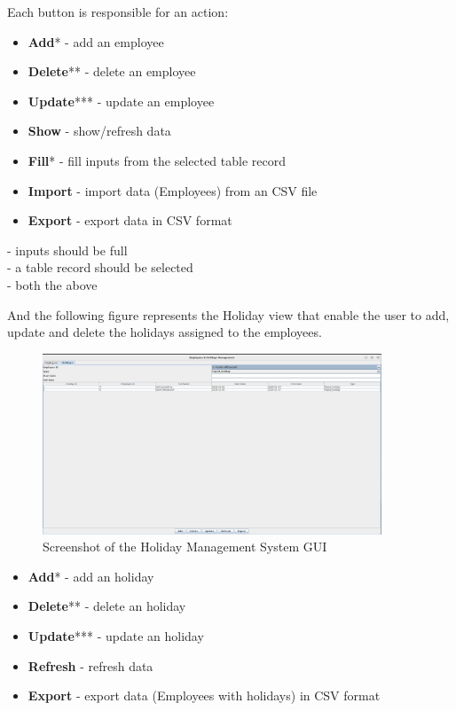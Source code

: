 \documentclass[12pt]{article}
\begin{document}
Each button is responsible for an action:

\begin{itemize}
    \item \textbf{Add}* - add an employee
    \item \textbf{Delete}** - delete an employee
    \item \textbf{Update}*** - update an employee
    \item \textbf{Show} - show/refresh data
    \item \textbf{Fill}* - fill inputs from the selected table record
    \item \textbf{Import} - import data (Employees) from an CSV file
    \item  \textbf{Export} - export data in CSV format 
\end{itemize}

\noindent \text{*} - inputs should be full\\
\text{**} - a table record should be selected\\
\text{***} - both the above

\pagebreak

And the following figure represents the Holiday view that enable
the user to add, update and delete the holidays assigned to the
employees.

\begin{figure}[H]
  \centering
  \includegraphics[width=0.9\textwidth]{holiday_preview.png}
  \caption{Screenshot of the Holiday Management System GUI}
\end{figure}

\begin{itemize}
    \item \textbf{Add}* - add an holiday
    \item \textbf{Delete}** - delete an holiday
	\item \textbf{Update}*** - update an holiday
    \item \textbf{Refresh} - refresh data
    \item  \textbf{Export} - export data (Employees with holidays) in CSV format
\end{itemize}
\end{document}
